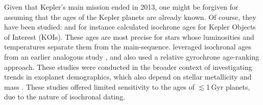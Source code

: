 \documentclass[11pt,twocolumn,tighten]{aastex63}
\begin{document}
Given that Kepler's main mission ended in 2013, one might be
forgiven for assuming that the ages of the Kepler planets are already
known.  Of course, they have been studied: \citet{Berger_2020b_rpage}
and \citet{Petigura_2022} for instance calculated isochrone ages for
Kepler Objects of Interest (KOIs).  These ages are most precise for
stars whose luminosities and temperatures separate them from the
main-sequence.  \citet{David_2021} leveraged isochronal ages from
an earlier analogous study \citep{Fulton_2018}, and also
used a relative gyrochrone age-ranking approach.
These studies were conducted in the broader context of investigating
trends in exoplanet demographics, which also depend on stellar
metallicity and mass \citep[e.g.][]{Petigura_2018}.  These studies
offered limited sensitivity to the ages of $\lesssim$1\,Gyr planets,
due to the nature of isochronal dating.
\end{document}
